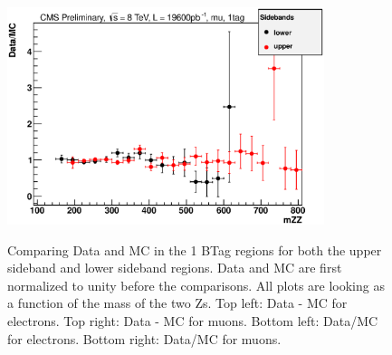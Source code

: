 \begin{figure}[htb!]
{\includegraphics[height=2.5in]{Systematics/plots/divide_mu_2_1}
\\
}
\caption{Comparing Data and MC in the 1 BTag regions for both the upper sideband and lower sideband regions. Data and MC are first normalized to unity before the comparisons. All plots are looking as a function of the mass of the two Zs. Top left: Data - MC for electrons.  Top right: Data - MC for muons.  Bottom left: Data/MC for electrons.  Bottom right: Data/MC for muons.
\label{fig:1tag_sideband_up_down}}  
\end{figure}
